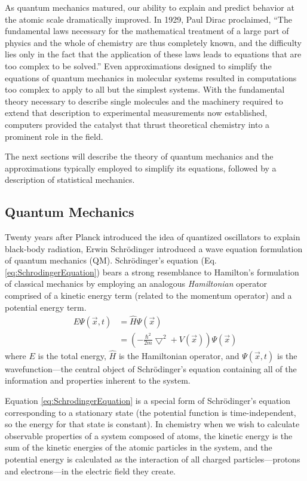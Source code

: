 As quantum mechanics matured, our ability to explain and predict behavior at the
atomic scale dramatically improved. In 1929, Paul Dirac proclaimed, ``The
fundamental laws necessary for the mathematical treatment of a large part of
physics and the whole of chemistry are thus completely known, and the difficulty
lies only in the fact that the application of these laws leads to equations that
are too complex to be solved.'' Even approximations designed to simplify the
equations of quantum mechanics in molecular systems resulted in computations too
complex to apply to all but the simplest systems. With the fundamental theory
necessary to describe single molecules and the machinery required to extend
that description to experimental measurements now established, computers
provided the catalyst that thrust theoretical chemistry into a prominent role in
the field.

The next sections will describe the theory of quantum mechanics and the
approximations typically employed to simplify its equations, followed by
a description of statistical mechanics.

\subsection{Quantum Mechanics}

Twenty years after Planck introduced the idea of quantized oscillators to
explain black-body radiation, Erwin Schr\"odinger introduced a wave equation
formulation of quantum mechanics (QM). \cite{Schrodinger1926} Schr\"odinger's
equation (Eq. \ref{eq:SchrodingerEquation}) bears a strong resemblance to
Hamilton's formulation of classical mechanics by employing an analogous
\textit{Hamiltonian} operator comprised of a kinetic energy term (related to the
momentum operator) and a potential energy term.
\begin{align}
   E \Psi(\vec{x}, t) & = \hat{H} \Psi(\vec{x}) \nonumber \\
   & = \left ( -\frac {\hbar ^ 2} {2 m} \bigtriangledown ^ 2 + V(\vec{x})
   \right) \Psi(\vec{x})
   \label{eq:SchrodingerEquation}
\end{align}
where $E$ is the total energy, $\hat{H}$ is the Hamiltonian operator, and
$\Psi(\vec{x}, t)$ is the wavefunction---the central object of Schr\"odinger's
equation containing all of the information and properties inherent to the
system.

Equation \ref{eq:SchrodingerEquation} is a special form of Schr\"odinger's
equation corresponding to a stationary state (\ie the potential function is
time-independent, so the energy for that state is constant). In chemistry when
we wish to calculate observable properties of a system composed of atoms, the
kinetic energy is the sum of the kinetic energies of the atomic particles in the
system, and the potential energy is calculated as the interaction of all charged
particles---protons and electrons---in the electric field they create.

